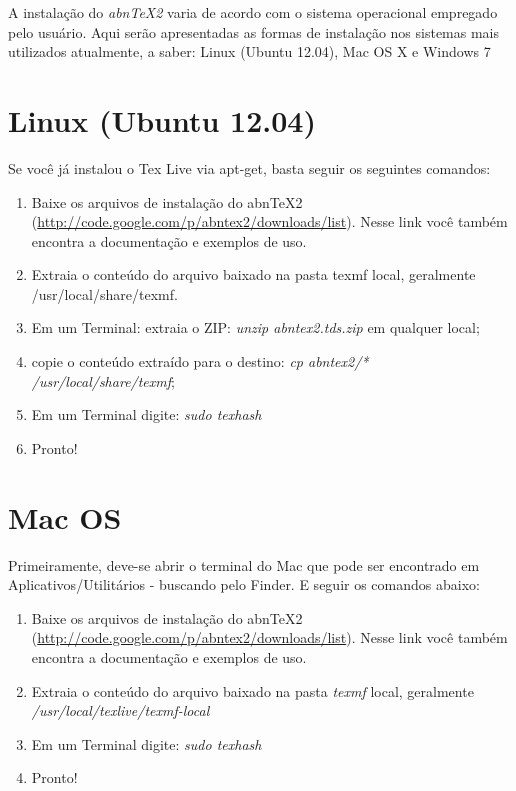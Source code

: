 
A instalação do \emph{abnTeX2} varia de acordo com o sistema operacional empregado pelo usuário. Aqui serão apresentadas as formas de instalação nos sistemas mais utilizados atualmente, a saber: Linux (Ubuntu 12.04), Mac OS X e Windows 7

\section{Linux (Ubuntu 12.04)}

Se você já instalou o Tex Live via apt-get, basta seguir os seguintes comandos:

\begin{enumerate}

\item Baixe os arquivos de instalação do abnTeX2 (\url{http://code.google.com/p/abntex2/downloads/list}). Nesse link você também encontra a documentação e exemplos de uso.
\item Extraia o conteúdo do arquivo baixado na pasta texmf local, geralmente /usr/local/share/texmf. 
\item Em um Terminal: extraia o ZIP: \emph{unzip abntex2.tds.zip} em qualquer local;
\item copie o conteúdo extraído para o destino: \emph{cp abntex2/* /usr/local/share/texmf};
\item Em um Terminal digite: \emph{sudo texhash}
\item Pronto!
\end{enumerate}

\section{Mac OS}

Primeiramente, deve-se abrir o terminal do Mac que pode ser encontrado em Aplicativos/Utilitários - buscando pelo Finder.  E seguir os comandos abaixo:
\begin{enumerate}
\item Baixe os arquivos de instalação do abnTeX2 (\url{http://code.google.com/p/abntex2/downloads/list}). Nesse link você também encontra a documentação e exemplos de uso.
\item Extraia o conteúdo do arquivo baixado na pasta \emph{texmf} local, geralmente \emph{/usr/local/texlive/texmf-local}
\item Em um Terminal digite: \emph{sudo texhash}
\item Pronto!
\end{enumerate}
 
